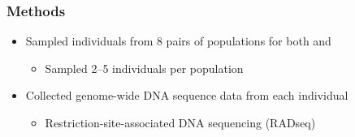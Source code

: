 \begin{frame}
    \frametitle{Methods}

    \begin{minipage}[t][0.62\textheight][t]{\linewidth}
        \centerline{
        }
    \end{minipage}

    \begin{minipage}[t][0.4\textheight][t]{\linewidth}
    \begin{itemize}
        \item Sampled individuals from 8 pairs of populations for both
             and 
        \begin{itemize}
            \item Sampled 2--5 individuals per population
        \end{itemize}
        \item Collected genome-wide DNA sequence data from each individual
        \begin{itemize}
            \item Restriction-site-associated DNA sequencing (RADseq)
        \end{itemize}
    \end{itemize}
    \end{minipage}
\end{frame}
